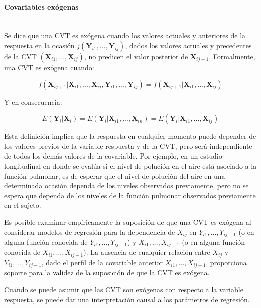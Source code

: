 \documentclass[spanish]{article}
\numberwithin{figure}{subsection}
\numberwithin{equation}{subsection}
\numberwithin{table}{subsection}
\begin{document}
\paragraph{Covariables exógenas} \mbox{} \\

Se dice que una CVT es
exógena cuando los valores actuales y anteriores de la respuesta en la ocasión
$j (\bm{Y}_{i1}, ..., \bm{Y}_{ij})$, dados los valores actuales y precedentes de
la CVT $(\bm{X}_{i1}, ..., \bm{X}_{ij})$, no predicen el valor posterior de
$\bm{X}_{ij+1}$. Formalmente, una CVT es exógena cuando:

\begin{equation}
	\label{exogeneidad}
	f(\bm{X}_{ij+1}|\bm{X}_{i1}, ..., \bm{X}_{ij}, \bm{Y}_{i1}, ..., \bm{Y}_{ij}) =
	f(\bm{X}_{ij+1}|\bm{X}_{i1}, ..., \bm{X}_{ij})
\end{equation}

Y en consecuencia:

\begin{equation}
	\label{exogeneidad debil}
	E(\bm{Y}_i|\bm{X}_i) = E(\bm{Y}_i|\bm{X}_{i1}, ..., \bm{X}_{in}) = E(\bm{Y}_i|\bm{X}_{i1}, ..., \bm{X}_{ij})
\end{equation}

Esta definición implica que la respuesta en cualquier momento puede depender de
los valores previos de la variable respuesta y de la CVT, pero será
independiente de todos los demás valores de la covariable. Por ejemplo, en un
estudio longitudinal en donde se evalúa si el nivel de polución en el aire está
asociado a la función pulmonar, es de esperar que el nivel de polución del aire
en una determinada ocasión dependa de los niveles observados previamente, pero
no se espera que dependa de los niveles de la función pulmonar observados
previamente en el sujeto.

Es posible examinar empíricamente la suposición de que una CVT es exógena al
considerar modelos de regresión para la dependencia de $X_{ij}$ en
$Y_{i1}, ..., Y_{ij-1}$ (o en alguna función conocida de
$Y_{i1}, ..., Y_{ij-1}$) y $X_{i1}, ..., X_{ij-1}$ (o en alguna función conocida
de $X_{i1}, ..., X_{ij-1}$). La ausencia de cualquier relación entre $X_{ij}$ y
$Y_{i1}, ..., Y_{ij-1}$, dado el perfil de la covariable anterior
$X_{i1}, ..., X_{ij-1}$, proporciona soporte para la validez de la suposición de
que la CVT es exógena.

Cuando se puede asumir que las CVT son exógenas con respecto a la variable
respuesta, se puede dar una interpretación causal a los parámetros de regresión.
\end{document}
